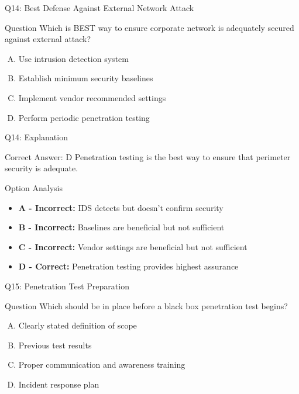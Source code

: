\documentclass{beamer}
\begin{document}
	\begin{frame}{Q14: Best Defense Against External Network Attack}
		\begin{block}{Question}
			Which is BEST way to ensure corporate network is adequately secured against external attack?
		\end{block}
		\begin{enumerate}[(A)]
			\item Use intrusion detection system
			\item Establish minimum security baselines
			\item Implement vendor recommended settings
			\item Perform periodic penetration testing
		\end{enumerate}
	\end{frame}
	
	\begin{frame}{Q14: Explanation}
		\begin{block}{Correct Answer: D}
			Penetration testing is the best way to ensure that perimeter security is adequate.
		\end{block}
		\begin{block}{Option Analysis}
			\begin{itemize}
				\item \textbf{A - Incorrect:} IDS detects but doesn't confirm security
				\item \textbf{B - Incorrect:} Baselines are beneficial but not sufficient
				\item \textbf{C - Incorrect:} Vendor settings are beneficial but not sufficient
				\item \textbf{D - Correct:} Penetration testing provides highest assurance
			\end{itemize}
		\end{block}
	\end{frame}
	
	\begin{frame}{Q15: Penetration Test Preparation}
		\begin{block}{Question}
			Which should be in place before a black box penetration test begins?
		\end{block}
		\begin{enumerate}[(A)]
			\item Clearly stated definition of scope
			\item Previous test results
			\item Proper communication and awareness training
			\item Incident response plan
		\end{enumerate}
	\end{frame}
	
\end{document}

